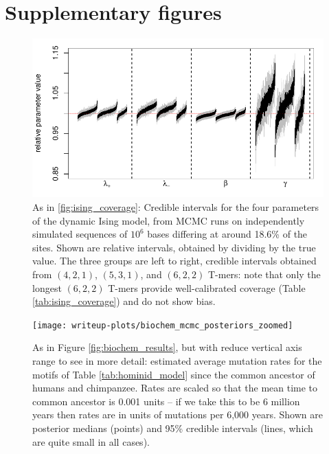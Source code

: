 \documentclass{article}
\theoremstyle{plain}
\theoremstyle{definition}
\begin{document}


\appendix

\section{Supplementary figures}

\begin{figure}
    \begin{center}
        \includegraphics{writeup-plots/coverage_results_all}
    \end{center}
    \caption{
        As in \ref{fig:ising_coverage}:
        Credible intervals for the four parameters of the dynamic Ising model,
        from MCMC runs on independently simulated sequences of $10^6$ bases
        differing at around 18.6\% of the sites.
        Shown are relative intervals, obtained by dividing by the true value.
        The three groups are left to right, credible intervals obtained from $(4,2,1)$, $(5,3,1)$, and $(6,2,2)$ T-mers:
        note that only the longest $(6,2,2)$ T-mers provide well-calibrated coverage (Table \ref{tab:ising_coverage})
        and do not show bias.
        \label{fig:all_ising_coverage}}
\end{figure}

\begin{figure}
    \begin{center}
        \texttt{[image: writeup-plots/biochem\_mcmc\_posteriors\_zoomed]}
    \end{center}
    \caption{
        As in Figure \ref{fig:biochem_results}, but with reduce vertical axis range
        to see in more detail:
        estimated average mutation rates
        for the motifs of Table \ref{tab:hominid_model}
        since the common ancestor of humans and chimpanzee.
        Rates are scaled so that the mean time to common ancestor is 0.001 units --
        if we take this to be 6 million years \citep{scally2012insights}
        then rates are in units of mutations per 6,000 years.
        Shown are posterior medians (points) and 95\% credible intervals (lines, which are quite small in all cases).
        \label{sfig:biochem_results_zoom}}
\end{figure}
\end{document}
